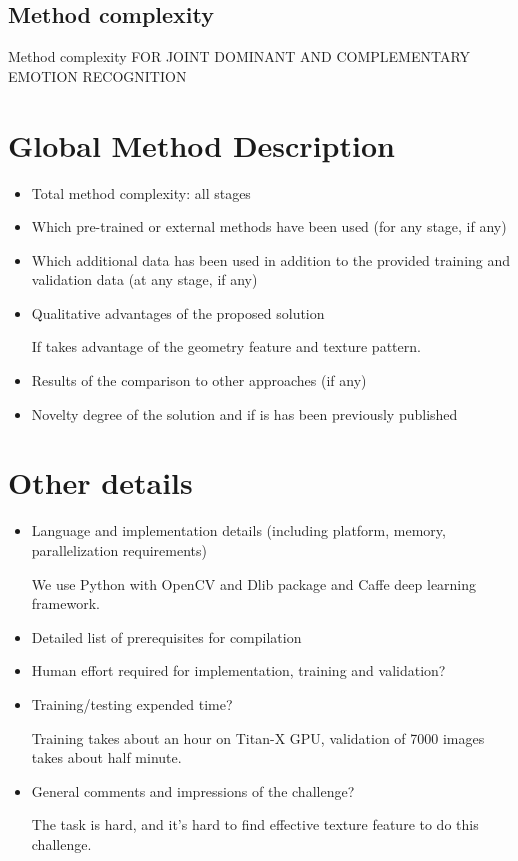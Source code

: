 \documentclass{article}
\begin{document}
\subsection{Method complexity}
Method complexity FOR JOINT DOMINANT AND COMPLEMENTARY EMOTION RECOGNITION


\section{Global Method Description}

\begin{itemize}
\item Total method complexity: all stages
\item Which pre-trained or external methods have been used (for any stage, if any) 
\item Which additional data has been used in addition to the provided training and validation data (at any stage, if any) 
\item Qualitative advantages of the proposed solution

If takes advantage of the geometry feature and texture pattern.
\item Results of the comparison to other approaches (if any)
\item Novelty degree of the solution and if is has been previously published
\end{itemize}

\section{Other details}

\begin{itemize}
\item Language and implementation details (including platform, memory, parallelization requirements)

We use Python with OpenCV and Dlib package and Caffe deep learning framework.
\item Detailed list of prerequisites for compilation
\item Human effort required for implementation, training and validation?
\item Training/testing expended time? 

Training takes about an hour on Titan-X GPU, validation of 7000 images takes about half minute.
\item General comments and impressions of the challenge?

The task is hard, and it's hard to find effective texture feature to do this challenge.
\end{itemize}
\end{document}
